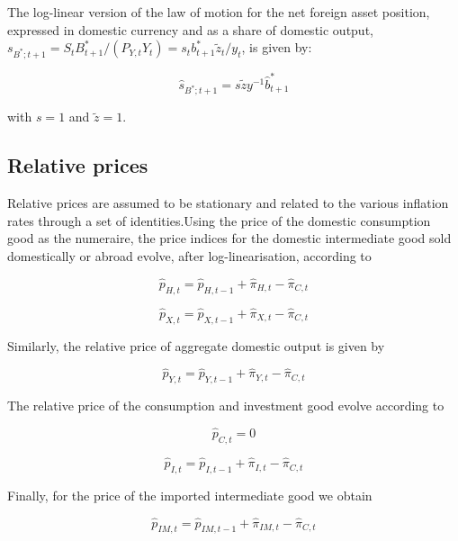 \documentclass[a4paper,11pt]{article}
\numberwithin{equation}{section}
\begin{document}
	The log-linear version of the law of motion for the net foreign asset position, expressed in domestic currency and as a share of domestic output, $s_{B^*;t+1}=S_tB_{t+1}^*/\left(P_{Y,t}Y_t\right)=s_tb_{t+1}^*\tilde{z}_t/y_t$, is given by:
	
	\begin{equation}
	\hat{s}_{B^*;t+1}=s\tilde{z}y^{-1}\hat{b}_{t+1}^*
	\end{equation} 
	
	with $s=1$ and $\tilde{z}=1$. 
	
	\subsection{Relative prices}
	
	Relative prices are assumed to be stationary and related to the various inflation rates through a set of identities.{\color{red}Using the price of the domestic consumption good as the numeraire}, the price indices for the domestic intermediate good sold domestically or abroad evolve, after log-linearisation, according to
	
	\begin{equation}
	\hat{p}_{H,t}=\hat{p}_{H,t-1}+\hat{\pi}_{H,t}-\hat{\pi}_{C,t}
	\end{equation}
	
	\begin{equation}
	\hat{p}_{X,t}=\hat{p}_{X,t-1}+\hat{\pi}_{X,t}-\hat{\pi}_{C,t}
	\end{equation}
	
	Similarly, the relative price of aggregate domestic output is given by
	
	\begin{equation}
	\hat{p}_{Y,t}=\hat{p}_{Y,t-1}+\hat{\pi}_{Y,t}-\hat{\pi}_{C,t}
	\end{equation}
	
	The relative price of the consumption and investment good evolve according to
	
	\begin{equation}
	\hat{p}_{C,t}=0
	\end{equation}
	
	\begin{equation}
	\hat{p}_{I,t}=\hat{p}_{I,t-1}+\hat{\pi}_{I,t}-\hat{\pi}_{C,t}
	\end{equation}
	
	Finally, for the price of the imported intermediate good we obtain
	
	\begin{equation}
	\hat{p}_{IM,t}=\hat{p}_{IM,t-1}+\hat{\pi}_{IM,t}-\hat{\pi}_{C,t}
	\end{equation}
	
\end{document}
